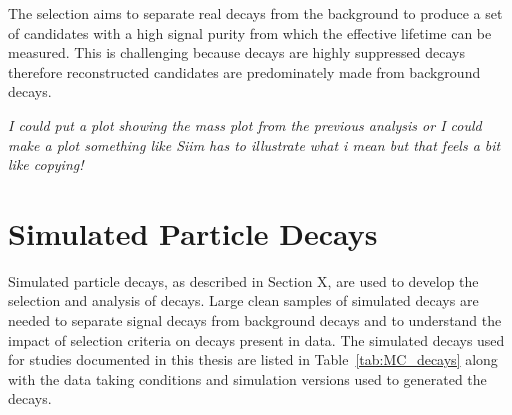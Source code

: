 The selection aims to separate real \bsmumu decays from the background to produce a set of \bsmumu candidates with a high signal purity from which the \bs effective lifetime can be measured. This is challenging because \bsmumu decays are highly suppressed decays therefore reconstructed candidates are predominately made from background decays.



{\it I could put a plot showing the mass plot from the previous analysis or I could make a plot something like Siim has to illustrate what i mean but that feels a bit like copying!}

\section{Simulated Particle Decays}
\label{sec:MCsamples}
Simulated particle decays, as described in Section X, are used to develop the selection and analysis of \bsmumu decays. Large clean samples of simulated decays are needed to separate signal decays from background decays and to understand the impact of selection criteria on decays present in data. 
The simulated decays used for studies documented in this thesis are listed in Table~\ref{tab:MC_decays} along with the data taking conditions and simulation versions used to generated the decays.

